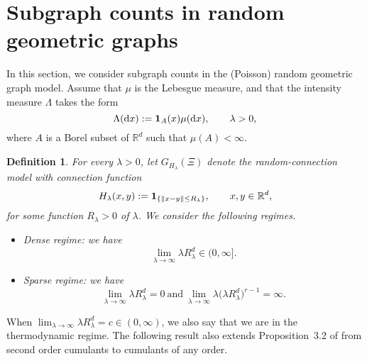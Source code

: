 \documentclass[12pt]{article}
\newcommand{\R}{\mathbb{R}}
\newcommand{\bone}{{\bf 1}}
\newtheorem{definition}[prop]{Definition}
\def\real{{\mathord{\mathbb R}}}
\numberwithin{equation}{section}
\begin{document}
\section{Subgraph counts in random geometric graphs}
\label{rgg}
\noindent
In this section, we consider subgraph counts in
the (Poisson) random geometric graph model.
Assume that $\mu$ is the Lebesgue measure,
and that the intensity measure $\Lambda$ takes the form 
$$\Lambda (\mathrm{d}x) := {\bf 1}_A (x) \mu(\mathrm{d}x),\qquad\lambda>0,$$
  where $A$ is a Borel subset of $\real^d$
  such that $\mu (A)<\infty$. 
\begin{definition}
  For every $\lambda >0$,
  let $G_{H_\lambda} (\Xi)$
  denote the random-connection model
  with connection function 
  $$
  H_\lambda (x,y):=\bone_{\{\|x-y\|\leq R_\lambda\}},
  \qquad x,y\in\R^d,
  $$
  for some function $R_\lambda>0$ of $\lambda$.
 We consider the following regimes. 
\begin{itemize}
\item Dense regime: we have 
$$ 
    \lim_{\lambda\to \infty} \lambda R_\lambda^d \in (0,\infty]. 
$$
\item Sparse regime: we have 
$$ 
 \lim_{\lambda\to \infty} \lambda R_\lambda^d = 0
\ \mathrm{and} \
\lim_{\lambda\to \infty}
\lambda \big( \lambda R_\lambda^d \big)^{r-1} = \infty.
$$
\end{itemize} 
\end{definition}
When $\lim_{\lambda\to \infty} \lambda R_\lambda^d = c \in (0,\infty )$, 
we also say that we are in the thermodynamic regime.
The following result also extends Proposition~3.2 of \cite{lachiezerey2}
from second order cumulants to cumulants of any order. 
\end{document}
